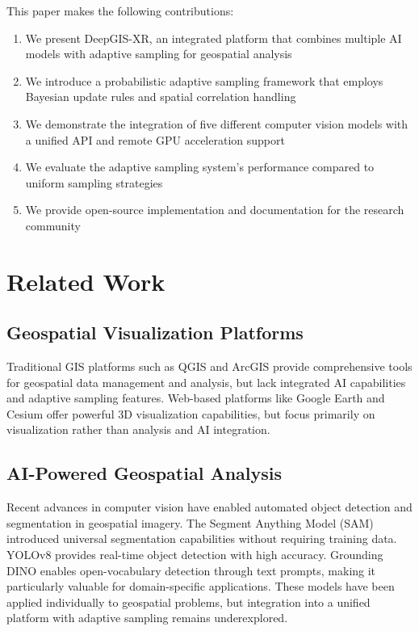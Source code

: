 \documentclass[conference]{IEEEtran}
\begin{document}
This paper makes the following contributions:

\begin{enumerate}
    \item We present DeepGIS-XR, an integrated platform that combines multiple AI models with adaptive sampling for geospatial analysis
    \item We introduce a probabilistic adaptive sampling framework that employs Bayesian update rules and spatial correlation handling
    \item We demonstrate the integration of five different computer vision models with a unified API and remote GPU acceleration support
    \item We evaluate the adaptive sampling system's performance compared to uniform sampling strategies
    \item We provide open-source implementation and documentation for the research community
\end{enumerate}

\section{Related Work}

\subsection{Geospatial Visualization Platforms}

Traditional GIS platforms such as QGIS \cite{qgis_ref} and ArcGIS \cite{arcgis_ref} provide comprehensive tools for geospatial data management and analysis, but lack integrated AI capabilities and adaptive sampling features. Web-based platforms like Google Earth \cite{google_earth_ref} and Cesium \cite{cesium_ref} offer powerful 3D visualization capabilities, but focus primarily on visualization rather than analysis and AI integration.

\subsection{AI-Powered Geospatial Analysis}

Recent advances in computer vision have enabled automated object detection and segmentation in geospatial imagery. The Segment Anything Model (SAM) \cite{sam_ref} introduced universal segmentation capabilities without requiring training data. YOLOv8 \cite{yolov8_ref} provides real-time object detection with high accuracy. Grounding DINO \cite{grounding_dino_ref} enables open-vocabulary detection through text prompts, making it particularly valuable for domain-specific applications. These models have been applied individually to geospatial problems, but integration into a unified platform with adaptive sampling remains underexplored.
\end{document}
